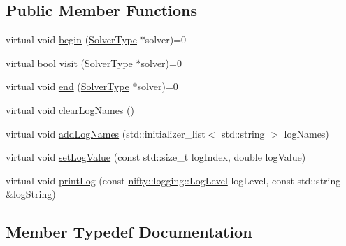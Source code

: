\subsection*{Public Member Functions}
\begin{DoxyCompactItemize}
\item 
virtual void \hyperlink{classnifty_1_1graph_1_1opt_1_1common_1_1VisitorBase_a8c4462a0cd838b0082f7157ad4b2d770}{begin} (\hyperlink{classnifty_1_1graph_1_1opt_1_1common_1_1VisitorBase_a433d03139897d4aefe27315b2bbb3adc}{Solver\+Type} $\ast$solver)=0
\item 
virtual bool \hyperlink{classnifty_1_1graph_1_1opt_1_1common_1_1VisitorBase_aaeef625f11705918d3fdd05f2550a879}{visit} (\hyperlink{classnifty_1_1graph_1_1opt_1_1common_1_1VisitorBase_a433d03139897d4aefe27315b2bbb3adc}{Solver\+Type} $\ast$solver)=0
\item 
virtual void \hyperlink{classnifty_1_1graph_1_1opt_1_1common_1_1VisitorBase_aab59ead6ecef2fcaf3da5a96d0ec4c51}{end} (\hyperlink{classnifty_1_1graph_1_1opt_1_1common_1_1VisitorBase_a433d03139897d4aefe27315b2bbb3adc}{Solver\+Type} $\ast$solver)=0
\item 
virtual void \hyperlink{classnifty_1_1graph_1_1opt_1_1common_1_1VisitorBase_a9ac54577b1a0378834ffe2029a321744}{clear\+Log\+Names} ()
\item 
virtual void \hyperlink{classnifty_1_1graph_1_1opt_1_1common_1_1VisitorBase_acc4f1b419303965b0313ca83c6a7a420}{add\+Log\+Names} (std\+::initializer\+\_\+list$<$ std\+::string $>$ log\+Names)
\item 
virtual void \hyperlink{classnifty_1_1graph_1_1opt_1_1common_1_1VisitorBase_a41efc013731cca97176a61be58db0094}{set\+Log\+Value} (const std\+::size\+\_\+t log\+Index, double log\+Value)
\item 
virtual void \hyperlink{classnifty_1_1graph_1_1opt_1_1common_1_1VisitorBase_ad9092d8387ff327b254df08ef97363a3}{print\+Log} (const \hyperlink{namespacenifty_1_1logging_a3385625f9a0dbb17f70c47d3fca2f64d}{nifty\+::logging\+::\+Log\+Level} log\+Level, const std\+::string \&log\+String)
\end{DoxyCompactItemize}


\subsection{Member Typedef Documentation}
\mbox{\label{classnifty_1_1graph_1_1opt_1_1common_1_1VisitorBase_a433d03139897d4aefe27315b2bbb3adc}} 
